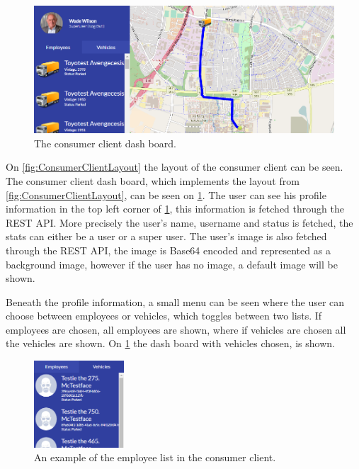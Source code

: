 \begin{figure}[h]
    \centering
    \includegraphics[scale=0.35]{img/ConsumerClientExample.png}
    \caption{The consumer client dash board.}
    \label{fig:ConsumerClientExample}
\end{figure}

On \cref{fig:ConsumerClientLayout} the layout of the consumer client can be seen.
The consumer client dash board, which implements the layout from \cref{fig:ConsumerClientLayout}, can be seen on \cref{fig:ConsumerClientExample}.
The user can see his profile information in the top left corner of \cref{fig:ConsumerClientExample}, this information is fetched through the REST API.
More precisely the user's name, username and status is fetched, the stats can either be a user or a super user.
The user's image is also fetched through the REST API, the image is Base64 encoded and represented as a background image, however if the user has no image, a default image will be shown.

Beneath the profile information, a small menu can be seen where the user can choose between employees or vehicles, which toggles between two lists.
If employees are chosen, all employees are shown, where if vehicles are chosen all the vehicles are shown. 
On \cref{fig:ConsumerClientExample} the dash board with vehicles chosen, is shown.

\begin{figure}[h]
    \centering
    \includegraphics[width=0.3\textwidth]{img/displayOfMenuesInConsumerClient.png}
    \caption{An example of the employee list in the consumer client.}
    \label{fig:ConsumerClientMenus}
\end{figure}

